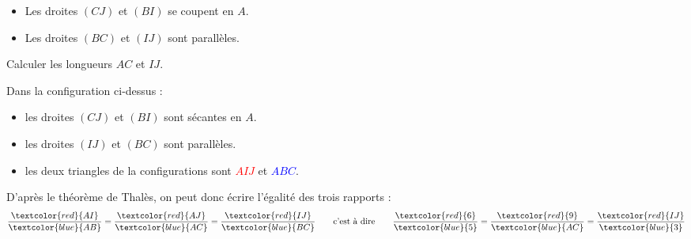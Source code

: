 \begin{methode*1}
\begin{minipage}{8cm}
            \end{minipage}
            \begin{minipage}{8cm}
                \begin{itemize}
                    \item Les droites $(CJ)$ et $(BI)$ se coupent en $A$.
                    \item Les droites $(BC)$ et $(IJ)$ sont parallèles.
                \end{itemize}
                Calculer les longueurs $AC$ et $IJ$.
            \end{minipage}
            
            \correction
            Dans la configuration ci-dessus : 
            \begin{itemize}
                \item les droites $(CJ)$ et $(BI)$ sont sécantes en $A$.
                \item les droites $(IJ)$ et $(BC)$ sont parallèles.
                \item les deux triangles de la configurations sont \textcolor{red}{$AIJ$} et \textcolor{blue}{$ABC$}.
            \end{itemize}
            D'après le théorème de Thalès, on peut donc écrire l'égalité des trois rapports :
            $$\frac{\textcolor{red}{AI}}{\textcolor{blue}{AB}}=\frac{\textcolor{red}{AJ}}{\textcolor{blue}{AC}}=\frac{\textcolor{red}{IJ}}{\textcolor{blue}{BC}}\qquad\mbox{c'est à dire}\qquad\frac{\textcolor{red}{6}}{\textcolor{blue}{5}}=\frac{\textcolor{red}{9}}{\textcolor{blue}{AC}}=\frac{\textcolor{red}{IJ}}{\textcolor{blue}{3}}$$


\end{methode*1}
